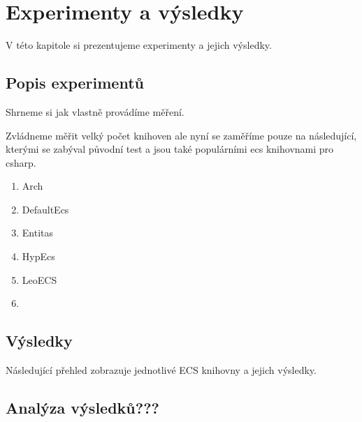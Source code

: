 \chapter{Experimenty a výsledky}
V této kapitole si prezentujeme experimenty a jejich výsledky.

\section{Popis experimentů}
Shrneme si jak vlastně provádíme měření.

Zvládneme měřit velký počet knihoven ale nyní se zaměříme pouze na následující, kterými se zabýval původní test a jsou také populárními ecs knihovnami pro csharp.

\begin{enumerate}
    \item Arch~\cite{Arch}
    \item DefaultEcs~\cite{DefaultEcs}
    \item Entitas~\cite{Entitas}
    \item HypEcs~\cite{HypEcs}
    \item LeoECS~\cite{LeoECS}
    \item {}
\end{enumerate}

\section{Výsledky}
Následující přehled zobrazuje jednotlivé ECS knihovny a jejich výsledky.


\section{Analýza výsledků???}


















